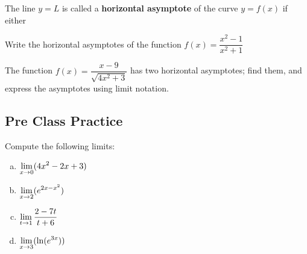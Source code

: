 \documentclass[notes]{subfiles}
\begin{document}
		\begin{defn}
			The line \(y = L\) is called a \textbf{horizontal asymptote} of the curve \(y = f(x)\) if either 
				\vspace{.75in}
		\end{defn}
			\newpage
			
		\begin{ex}
			Write the horizontal asymptotes of the function \(f(x) = \dfrac{x^2-1}{x^2 + 1}\)
		\end{ex}

		\begin{ex}
			The function \(f(x) = \dfrac{x-9}{\sqrt{4x^2 + 3}}\) has two horizontal asymptotes; find them, and express the asymptotes using limit notation.
		\end{ex}
		
			\newpage
			
	\subsection*{Pre Class Practice}
		\begin{ex}
			Compute the following limits:
			\begin{enumerate}[(a)]
				\item \(\displaystyle \lim_{x\to 0} (4x^2-2x+3)\)
					
				\item \(\displaystyle \lim_{x\to 2} (e^{2x-x^2})\)
					
				\item \(\displaystyle \lim_{t\to 1} \dfrac{2-7t}{t+6}\)
					
				\item \(\displaystyle \lim_{x\to 3} (\ln (e^{3x}))\)
			\end{enumerate}
		\end{ex}
			\newpage
			
\end{document}
